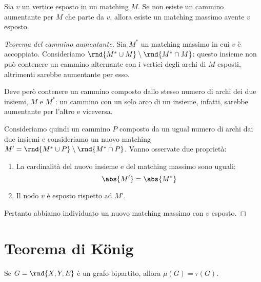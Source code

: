 \documentclass[\main/main.tex]{subfiles}
\begin{document}
\begin{theorem}
	Sia \(v\) un vertice esposto in un matching \(M\). Se non esiste un cammino aumentante per \(M\) che parte da \(v\), allora esiste un matching massimo avente \(v\) esposto.
\end{theorem}

\begin{proof}[Teorema del cammino aumentante]
	Sia \(M^*\) un matching massimo in cui \(v\) è accoppiato. Consideriamo \(\rnd{M^*\cup M}\setminus\rnd{M^* \cap M}\): questo insieme non può contenere un cammino alternante con i vertici degli archi di \(M\) esposti, altrimenti sarebbe aumentante per esso.

	Deve però contenere un cammino composto dallo stesso numero di archi dei due insiemi, \(M\) e \(M^*\): un cammino con un solo arco di un insieme, infatti, sarebbe aumentante per l'altro e viceversa.

	Consideriamo quindi un cammino \(P\) composto da un ugual numero di archi dai due insiemi e consideriamo un nuovo matching \(M' = \rnd{M^*\cup P}\setminus\rnd{M^* \cap P}\). Vanno osservate due proprietà:

	\begin{enumerate}
		\item La cardinalità del nuovo insieme e del matching massimo sono uguali:
		      \[
			      \abs{M'} = \abs{M^*}
		      \]
		\item Il nodo \(v\) è esposto rispetto ad \(M'\).
	\end{enumerate}
	Pertanto abbiamo individuato un nuovo matching massimo con \(v\) esposto.
\end{proof}
\clearpage
\section{Teorema di König}

\begin{theorem}
	Se \(G=\rnd{X, Y, E}\) è un grafo bipartito, allora \(\mu(G) = \tau(G)\).
\end{theorem}
\end{document}
